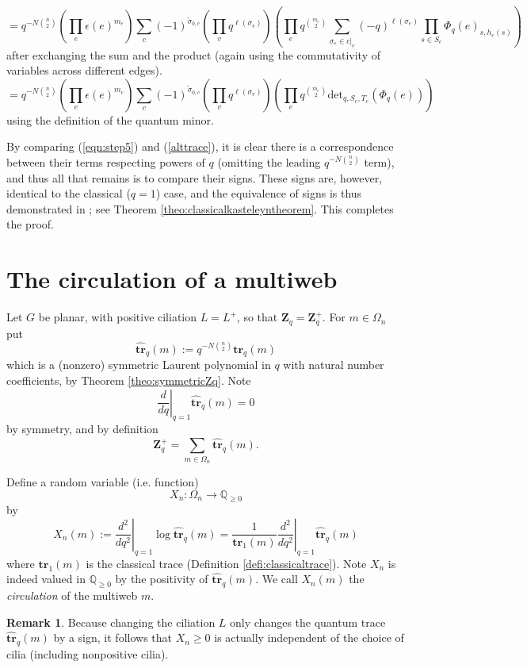 \documentclass[12pt, reqno]{amsart}
\theoremstyle{definition}
\newtheorem{rema}[theo]{Remark}
\renewcommand{\det}{\mathrm{det}}%
\renewcommand{\hat}{\widehat}
\renewcommand{\tilde}{\widetilde}
\newcommand{\be}{\begin{equation}}
\newcommand{\ee}{\end{equation}}
\newcommand{\Zq}{\mathbf{Z}_q}%
\newcommand{\trq}{\mathbf{tr}_q}%
\newcommand{\htrq}{\hat{\mathbf{tr}}_q}%
\begin{document}
$$
= q^{-N\binom{n}{2}}\left( \prod_{e}\epsilon(e)^{m_e} \right) \sum_{c} (-1)^{\tilde{\sigma}_{0,c}}\left(\prod_v q^{\ell(\sigma_v)}\right) \left(\prod_e q^{\binom{m_e}{2}} \sum_{\sigma_e\in c|_e} (-q)^{\ell(\sigma_e)}\prod_{s\in S_e}\Phi_q(e)_{s,h_e(s)}\right)   \label{eqn:step4}
$$
after exchanging the sum and the product (again using the commutativity of variables across different edges).
\be\label{eqn:step5}
= q^{-N\binom{n}{2}} \left( \prod_{e}\epsilon(e)^{m_e} \right) \sum_{c} (-1)^{\tilde{\sigma}_{0,c}}\left(\prod_v q^{\ell(\sigma_v)}\right) \left(\prod_e q^{\binom{m_e}{2}} \det_{q,S_e,T_e}(\Phi_q(e))\right) 
\ee
using the definition of the quantum minor.

By comparing (\ref{eqn:step5}) and (\ref{alttrace}), it is clear there is a correspondence between their terms respecting powers of $q$ (omitting the leading $q^{-N\binom{n}{2}}$ term), and thus all that remains is to compare their signs.  These signs are, however, identical to the classical ($q=1$) case, and the equivalence of signs is thus demonstrated in \cite{DKS,KenyonOvenhouse}; see Theorem \ref{theo:classicalkasteleyntheorem}.  This completes the proof.

\section{The circulation of a multiweb}\label{ssec:randomvariable} 

Let $G$ be planar, with positive ciliation $L=L^+$, so that $\Zq=\Zq^+$.  For $m\in\Omega_n$ put 
\be\label{eq:normalizedqtrace}
\htrq(m):=q^{-N\binom{n}{2}}\trq(m)
\ee 
which is a (nonzero) symmetric Laurent polynomial in $q$ with natural number coefficients, by Theorem \ref{theo:symmetricZq}.  Note 
\be\label{eq:firstderivativeiszero}
\left.\frac{d}{dq}\right|_{q=1}\htrq(m)=0
\ee 
by symmetry, and by definition 
$$
\Zq^+=\sum_{m\in\Omega_n}\htrq(m).
$$

Define a random variable (i.e. function) 
$$
X_n : \Omega_n \to \mathbb{Q}_{\geq0}
$$ 
by 
$$
X_n(m):=\left.\frac{d^2}{dq^2}\right|_{q=1}\log\htrq(m)=\frac{1}{\mathbf{tr}_1(m)}\left.\frac{d^2}{dq^2}\right|_{q=1}\htrq(m)
$$ 
where $\mathbf{tr}_1(m)$ is the classical trace (Definition \ref{defi:classicaltrace}).    Note $X_n$ is indeed valued in $\mathbb{Q}_{\geq0}$ by the positivity of $\htrq(m)$.    We call $X_n(m)$ the \emph{circulation} of the multiweb $m$. 

\begin{rema}\label{rema:rvindependentofcilia}
Because changing the ciliation $L$ only changes the quantum trace $\htrq(m)$ by a sign, it follows that $X_n\geq0$ is actually independent of the choice of cilia (including nonpositive cilia).  
\end{rema}
\end{document}
